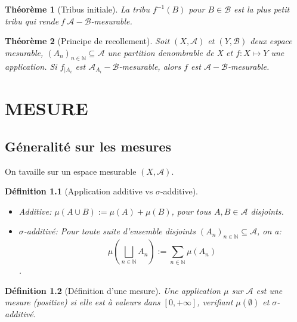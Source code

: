 \documentclass[a4paper,12pt,french]{report}
\theoremstyle{break}
\newtheorem{defin}{Définition}[section]
\newtheorem{theo}[defin]{Théorème}
\begin{document}
\begin{theo}[Tribus initiale]
	La tribu $f^{-1}(B)$ pour $B \in \mathcal{B}$ est la plus petit tribu qui rende f $\mathcal{A}-\mathcal{B}$-mesurable.
\end{theo}

\begin{theo}[Principe de recollement]
	Soit $(X, \mathcal{A})$ et $(Y, \mathcal{B})$ deux espace mesurable, $(A_{n})_{n \in \mathbb{N}} \subseteq \mathcal{A}$ une partition denombrable de X et $f : X \mapsto Y$ une application. Si $f_{| A_{i}}$ est $\mathcal{A}_{A_{i}}-\mathcal{B}$-mesurable, alors $f$ est $\mathcal{A}-\mathcal{B}$-mesurable.
\end{theo}


\chapter{MESURE}
\section{Géneralité sur les mesures}
On tavaille sur un espace mesurable $(X, \mathcal{A})$.

\begin{defin}[Application additive vs $\sigma$-additive]
\begin{itemize}
       \item Additive: $\mu (A \cup B) := \mu (A) + \mu (B)$, pour tous $A, B \in \mathcal{A}$ disjoints.
       \item $\sigma$-additivé: Pour toute suite d'ensemble disjoints $(A_{n})_{n \in \mathbb{N}} \subseteq \mathcal{A}$, on a: $$\mu (\bigsqcup_{n \in \mathbb{N}} A_{n}) := \sum_{n \in \mathbb{N}} \mu (A_{n})$$.
\end{itemize}
\end{defin}

\begin{defin}[Définition d'une mesure]
Une application $\mu$ sur $\mathcal{A}$ est une mesure (positive) si elle est à valeurs dans $[0, +\infty]$, verifiant $\mu (\emptyset)$ et $\sigma$-additivé.
\end{defin}
\end{document}
